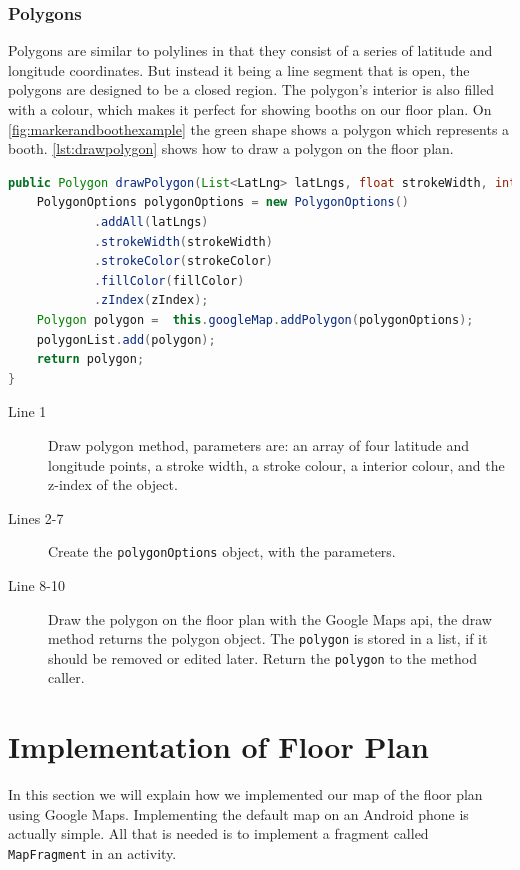 \subsubsection*{Polygons}
Polygons are similar to polylines in that they consist of a series of latitude and longitude coordinates. But instead it being a line segment that is open, the polygons are designed to be a closed region. The polygon's interior is also filled with a colour, which makes it perfect for showing booths on our floor plan. On \autoref{fig:markerandboothexample} the green shape shows a polygon which represents a booth. \autoref{lst:drawpolygon} shows how to draw a polygon on the floor plan.
\begin{lstlisting}[language=java, label=lst:drawpolygon, caption=Method for drawing a polygon.]
public Polygon drawPolygon(List<LatLng> latLngs, float strokeWidth, int strokeColor, int fillColor, int zIndex){
    PolygonOptions polygonOptions = new PolygonOptions()
            .addAll(latLngs)
            .strokeWidth(strokeWidth)
            .strokeColor(strokeColor)
            .fillColor(fillColor)
            .zIndex(zIndex);
    Polygon polygon =  this.googleMap.addPolygon(polygonOptions);
    polygonList.add(polygon);
    return polygon;
}
\end{lstlisting}
\begin{description}
\item[Line 1] Draw polygon method, parameters are: an array of four latitude and longitude points, a stroke width, a stroke colour, a interior colour, and the z-index of the object. 
\item[Lines 2-7] Create the \lstinline|polygonOptions| object, with the parameters.
\item[Line 8-10] Draw the polygon on the floor plan with the Google Maps \ac{api}, the draw method returns the polygon object. The \lstinline|polygon| is stored in a list, if it should be removed or edited later. Return the \lstinline|polygon| to the method caller.
\end{description}

\section{Implementation of Floor Plan}
In this section we will explain how we implemented our map of the floor plan using Google Maps. Implementing the default map on an Android phone is actually simple. All that is needed is to implement a fragment called \lstinline|MapFragment| in an activity.

